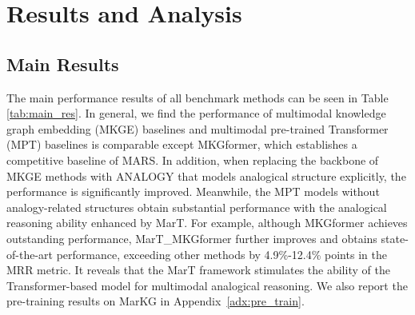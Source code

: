 \documentclass{article} \usepackage{iclr2023_conference,times}
\newcommand{\ours}{MarT}
\newcommand{\data}{MARS}
\begin{document}
\section{Results and Analysis} 
\label{sec:experiments}


\subsection{Main Results}

The main performance results of all benchmark methods can be seen in Table \ref{tab:main_res}. 
In general, we find the performance of multimodal knowledge graph embedding (MKGE) baselines and multimodal pre-trained Transformer (MPT) baselines is comparable except MKGformer, which establishes a competitive baseline of {\data}.
In addition, when replacing the backbone of MKGE methods with ANALOGY that models analogical structure explicitly, the performance is significantly improved. 
Meanwhile, the MPT models without analogy-related structures obtain substantial performance with the analogical reasoning ability enhanced by {\ours}.
For example, although MKGformer achieves outstanding performance, {\ours}\_MKGformer further improves and obtains state-of-the-art performance, exceeding other methods by 4.9\%-12.4\% points in the MRR metric.
It reveals that 
 the
{\ours} framework stimulates the ability of the Transformer-based model for multimodal analogical reasoning.
We also report the pre-training results on MarKG in Appendix~\ref{adx:pre_train}.
\end{document}
